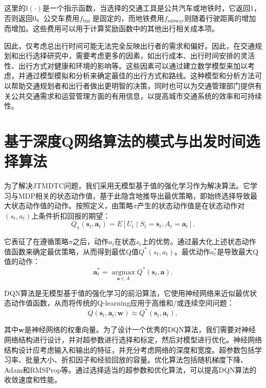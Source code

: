 这里的$\mathbb{I}(\cdot)$是一个指示函数，当选择的交通工具是公共汽车或地铁时，它返回1，否则返回0。公交车费用$f_{\text {bus }}$是固定的，而地铁费用$f_{\text {subway} }$则随着行驶距离的增加而增加。这些费用可以用于计算奖励函数中的其他出行相关成本项。

因此，仅考虑总出行时间可能无法完全反映出行者的需求和偏好。因此，在交通规划和出行选择研究中，需要考虑更多的因素，如出行成本、出行时间安排的灵活性、出行方式对健康和环境的影响等。这些因素可以通过建立数学模型来加以考虑，并通过模型模拟和分析来确定最佳的出行方式和路线。这种模型和分析方法可以帮助交通规划者和出行者做出更明智的决策，同时也可以为交通管理部门提供有关公共交通需求和运营管理方面的有用信息，以提高城市交通系统的效率和可持续性。

\section{基于深度Q网络算法的模式与出发时间选择算法}

为了解决JTMDTC问题，我们采用无模型基于值的强化学习作为解决算法。它学习与MDP相关的状态动作值，基于此隐含地推导出最优策略，即始终选择导致最大状态动作值的动作。按照定义，由策略$\pi$产生的状态动作值是在状态动作对$(s_t,a_t)$上条件折扣回报的期望：
\begin{equation}
Q_{\pi}\left(\bm{s}_{t}, \bm{a}_{t}\right)=E\left[U_{t} \mid S_{t}=\bm{s}_{t}, A_{t}=\bm{a}_{t}\right].
\end{equation}

它表征了在遵循策略$\pi$之后，动作$a_t$在状态$s_t$上的优势。通过最大化上述状态动作值函数来确定最优策略，从而得到最优Q值$Q^* (s_t,a_t)$。最优动作$a_t^*$是导致最大Q值的动作：
\begin{equation}
\bm{a}_{t}^{*}=\underset{\bm{a} \in A}{\operatorname{argmax}} Q^{*}\left(\bm{s}_{t}, \bm{a}\right).
\end{equation}

DQN算法是无模型基于值的强化学习的前沿算法，它使用神经网络来近似最优状态动作值函数，从而将传统的Q-learning应用于高维和/或连续空间问题：
\begin{equation}
Q\left(\bm{s}_{t}, \bm{a}_{t} ; \mathbf{w}\right) \approx Q^{*}\left(\bm{s}_{t}, \bm{a}_{t}\right),
\end{equation}

其中$\mathbf{w}$是神经网络的权重向量。为了设计一个优秀的DQN算法，我们需要对神经网络结构进行设计，并对超参数进行选择和标定，然后对模型进行优化。神经网络结构设计应考虑输入和输出的特征，并充分考虑网络的深度和宽度。超参数包括学习率、批量大小、折扣因子和经验回放的容量。优化算法包括随机梯度下降、Adam和RMSProp等。通过选择适当的超参数和优化算法，可以提高DQN算法的收敛速度和性能。

